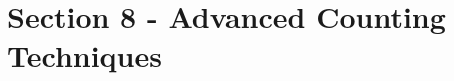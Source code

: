 \documentclass[../../Main.tex]{subfiles}
\begin{document}
\chapter{Section 8 - Advanced Counting Techniques}



\end{document}
